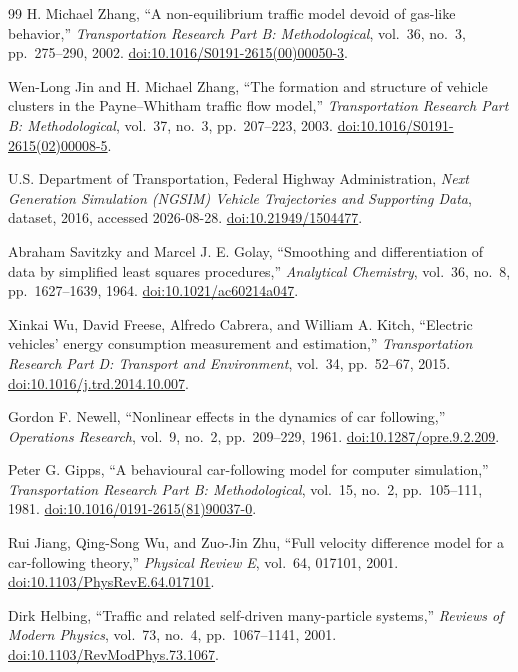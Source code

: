 \documentclass[11pt,a4paper,openany]{book}
\numberwithin{equation}{chapter}
\numberwithin{figure}{chapter}
\numberwithin{table}{chapter}
\begin{document}
\begin{thebibliography}{99}
H. Michael Zhang,
``A non-equilibrium traffic model devoid of gas-like behavior,''
\emph{Transportation Research Part B: Methodological}, vol.~36, no.~3, pp.~275--290, 2002.
\href{https://doi.org/10.1016/S0191-2615(00)00050-3}{doi:10.1016/S0191-2615(00)00050-3}.

Wen-Long Jin and H. Michael Zhang,
``The formation and structure of vehicle clusters in the Payne--Whitham traffic flow model,''
\emph{Transportation Research Part B: Methodological}, vol.~37, no.~3, pp.~207--223, 2003.
\href{https://doi.org/10.1016/S0191-2615(02)00008-5}{doi:10.1016/S0191-2615(02)00008-5}.

U.S. Department of Transportation, Federal Highway Administration,
\emph{Next Generation Simulation (NGSIM) Vehicle Trajectories and Supporting Data},
dataset, 2016, accessed 2026-08-28.
\href{https://doi.org/10.21949/1504477}{doi:10.21949/1504477}.

Abraham Savitzky and Marcel J. E. Golay,
``Smoothing and differentiation of data by simplified least squares procedures,''
\emph{Analytical Chemistry}, vol.~36, no.~8, pp.~1627--1639, 1964.
\href{https://doi.org/10.1021/ac60214a047}{doi:10.1021/ac60214a047}.

Xinkai Wu, David Freese, Alfredo Cabrera, and William A. Kitch,
``Electric vehicles' energy consumption measurement and estimation,''
\emph{Transportation Research Part D: Transport and Environment}, vol.~34, pp.~52--67, 2015.
\href{https://doi.org/10.1016/j.trd.2014.10.007}{doi:10.1016/j.trd.2014.10.007}.

Gordon F. Newell,
``Nonlinear effects in the dynamics of car following,''
\emph{Operations Research}, vol.~9, no.~2, pp.~209--229, 1961.
\href{https://doi.org/10.1287/opre.9.2.209}{doi:10.1287/opre.9.2.209}.

Peter G. Gipps,
``A behavioural car-following model for computer simulation,''
\emph{Transportation Research Part B: Methodological}, vol.~15, no.~2, pp.~105--111, 1981.
\href{https://doi.org/10.1016/0191-2615(81)90037-0}{doi:10.1016/0191-2615(81)90037-0}.

Rui Jiang, Qing-Song Wu, and Zuo-Jin Zhu,
``Full velocity difference model for a car-following theory,''
\emph{Physical Review E}, vol.~64, 017101, 2001.
\href{https://doi.org/10.1103/PhysRevE.64.017101}{doi:10.1103/PhysRevE.64.017101}.

Dirk Helbing,
``Traffic and related self-driven many-particle systems,''
\emph{Reviews of Modern Physics}, vol.~73, no.~4, pp.~1067--1141, 2001.
\href{https://doi.org/10.1103/RevModPhys.73.1067}{doi:10.1103/RevModPhys.73.1067}.


\end{thebibliography}
\end{document}
